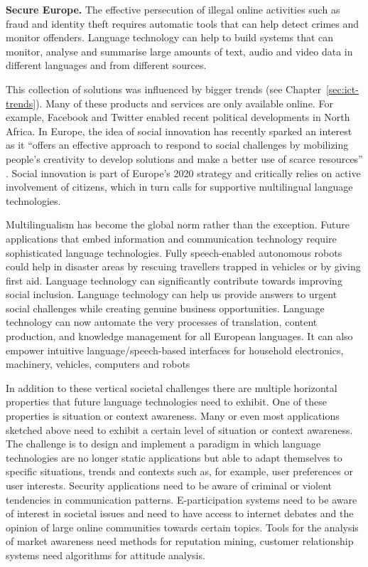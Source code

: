 \documentclass[10pt, plain]{../../metanetpaper}
\begin{document}
\begin{multicols}{2}
\textbf{Secure Europe.} The effective persecution of illegal online activities such as fraud and identity theft requires automatic tools that can help detect crimes and monitor offenders. Language technology can help to build systems that can monitor, analyse and summarise large amounts of text, audio and video data in different languages and from different sources.

This collection of solutions was influenced by bigger trends (see Chapter~\ref{sec:ict-trends}). Many of these products and services are only available online. For example, Facebook and Twitter enabled recent political developments in North Africa. In Europe, the idea of social innovation has recently sparked an interest as it “offers an effective approach to respond to social challenges by mobilizing people's creativity to develop solutions and make a better use of scarce resources” \cite{EC5}. Social innovation is part of Europe’s 2020 strategy and critically relies on active involvement of citizens, which in turn calls for supportive multilingual language technologies.

Multilingualism has become the global norm rather than the exception. Future applications that embed information and communication technology require sophisticated language technologies. Fully speech-enabled autonomous robots could help in disaster areas by rescuing travellers trapped in vehicles or by giving first aid. Language technology can significantly contribute towards improving social inclusion. Language technology can help us provide answers to urgent social challenges while creating genuine business opportunities.  Language technology can now automate the very processes of translation, content production, and knowledge management for all European languages. It can also empower intuitive language/speech-based interfaces for household electronics, machinery, vehicles, computers and robots

In addition to these vertical societal challenges there are multiple horizontal properties that future language technologies need to exhibit. One of these properties is situation or context awareness. Many or even most applications sketched above need to exhibit a certain level of situation or context awareness. The challenge is to design and implement a paradigm in which language technologies are no longer static applications but able to adapt themselves to specific situations, trends and contexts such as, for example, user preferences or user interests. Security applications need to be aware of criminal or violent tendencies in communication patterns. E-participation systems need to be aware of interest in societal issues and need to have access to internet debates and the opinion of large online communities towards certain topics. Tools for the analysis of market awareness need methods for reputation mining, customer relationship systems need algorithms for attitude analysis.


\end{multicols}
\end{document}
